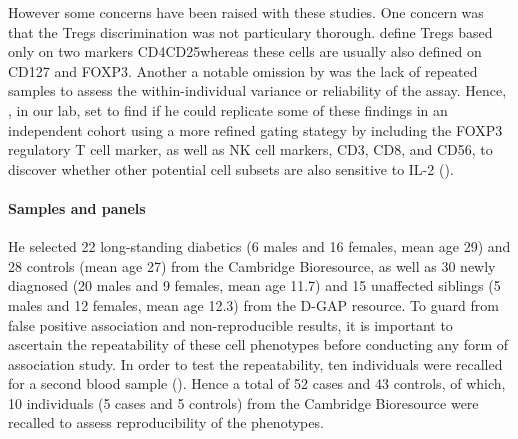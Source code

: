 However some concerns have been raised with these studies.
One concern was that the Tregs discrimination was not particulary thorough.
\citet{Long:2010ej} define Tregs based only on two markers CD4\positive CD25\positive whereas these cells are usually
also defined on CD127 and FOXP3.
Another a notable omission by \citet{Long:2010ej} was the lack of repeated samples to assess the within-individual variance
or reliability of the assay.
Hence, , in our lab, set to find if he could replicate some of these findings in an independent cohort
using a more refined gating stategy by including the FOXP3 regulatory T cell marker,
as well as NK cell markers, CD3, CD8, and CD56,
to discover whether other potential cell subsets
are also sensitive to IL-2 ().

\paragraph{Samples and panels}

He selected 22 long-standing diabetics (6 males and 16 females, mean age 29) and 28 controls (mean age 27) from the Cambridge Bioresource,
as well as 30 newly diagnosed (20 males and 9 females, mean age 11.7) and 15 unaffected siblings (5 males and 12 females, mean age 12.3) from the \Gls{D-GAP} resource.  
To guard from false positive association and non-reproducible results, 
it is important to ascertain the repeatability of these cell phenotypes before conducting any form of association study.
In order to test the repeatability, ten individuals were recalled for a second blood sample ().
Hence a total of 52 cases and 43 controls, of which, 10 individuals (5 cases and 5 controls) from the Cambridge Bioresource were recalled to assess reproducibility
of the phenotypes.  

